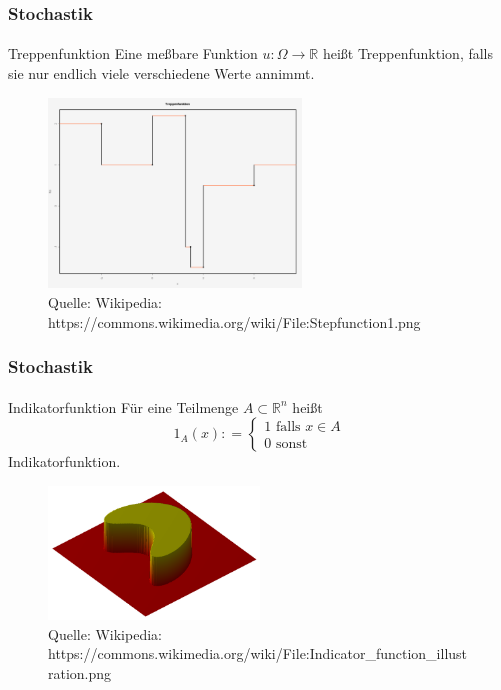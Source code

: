 \documentclass{beamer}
\begin{document}
\begin{frame}
    \frametitle{Stochastik}
\framesubtitle{}
    \begin{block}{Treppenfunktion}
        Eine meßbare Funktion $u: \Omega \to \mathbb{R}$ 
        heißt Treppenfunktion, 
        falls sie nur endlich viele verschiedene Werte annimmt.
    \end{block}


\begin{figure}[H]
    \centering
  \includegraphics[width=0.6\textwidth]{img/640px-Stepfunction1}
    \caption{Quelle: Wikipedia: https://commons.wikimedia.org/wiki/File:Stepfunction1.png}

\end{figure}
\end{frame}


\begin{frame}
    \frametitle{Stochastik}
\framesubtitle{}
\begin{block}{Indikatorfunktion}
    Für eine Teilmenge $A \subset \mathbb{R}^n$ heißt
    $$ 1_A (x): = \begin{cases} 1 \text{  falls }   x \in A  \\  0  \text{  sonst}  \end{cases}$$
    Indikatorfunktion.
    \end{block}
    
    \begin{figure}[H]
          \centering
        \includegraphics[width=0.5\textwidth]{img/640px-Indicator_function_illustration}
          \caption{Quelle: Wikipedia: https://commons.wikimedia.org/wiki/File:Indicator\_function\_illustration.png}
    
    \end{figure}
\end{frame}
\end{document}
